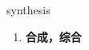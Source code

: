 
\begin{frame}
{\huge synthesis}
\begin{center}
\begin{enumerate}\Large
  \item \textbf{合成，综合}
\end{enumerate}
\end{center}
\end{frame}
